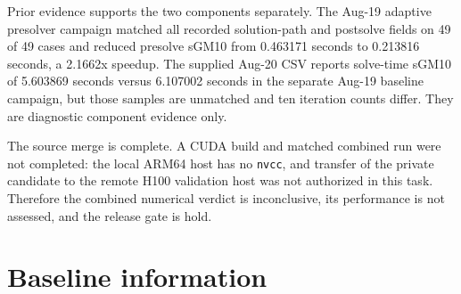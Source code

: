 \documentclass[10pt,a4paper]{article}
\begin{document}
Prior evidence supports the two components separately.  The Aug-19 adaptive
presolver campaign matched all recorded solution-path and postsolve fields on
49 of 49 cases and reduced presolve sGM10 from 0.463171 seconds to 0.213816
seconds, a 2.1662x speedup.  The supplied Aug-20 CSV reports solve-time sGM10
of 5.603869 seconds versus 6.107002 seconds in the separate Aug-19 baseline
campaign, but those samples are unmatched and ten iteration counts differ.
They are diagnostic component evidence only.

The source merge is complete.  A CUDA build and matched combined run were not
completed: the local ARM64 host has no \texttt{nvcc}, and transfer of the
private candidate to the remote H100 validation host was not authorized in
this task.  Therefore the combined numerical verdict is inconclusive, its
performance is not assessed, and the release gate is hold.

\section{Baseline information}
\end{document}
